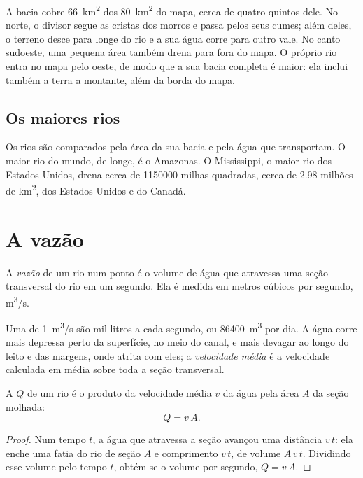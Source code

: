 A bacia cobre \qty{66}{km^2} dos \qty{80}{km^2} do mapa, cerca de quatro
quintos dele. No norte, o divisor segue as cristas dos morros e passa pelos
seus cumes; além deles, o terreno desce para longe do rio e a sua água corre
para outro vale. No canto sudoeste, uma pequena área também drena para fora
do mapa. O próprio rio entra no mapa pelo oeste, de modo que a sua bacia
completa é maior: ela inclui também a terra a montante, além da borda do
mapa.

\subsection*{Os maiores rios}

Os rios são comparados pela área da sua bacia e pela água que transportam.
O maior rio do mundo, de longe, é o Amazonas. O Mississippi, o maior rio dos
Estados Unidos, drena cerca de \num{1150000} milhas quadradas, cerca de 2.98
milhões de \unit{km^2}, dos Estados Unidos e do Canadá.

\section{A vazão}

\begin{definition}[Vazão]\label{def:g10:drainage-basins:discharge}
A \emph{vazão} de um rio num ponto é o volume de água que
atravessa uma seção transversal do rio em um segundo. Ela é medida em metros
cúbicos por segundo, \unit{m^3/s}.
\end{definition}

Uma  de \qty{1}{m^3/s} são mil litros a cada segundo, ou
\qty{86400}{m^3} por dia. A água corre mais depressa perto da superfície, no
meio do canal, e mais devagar ao longo do leito e das margens, onde atrita
com eles; a \emph{velocidade média} é a velocidade calculada em média sobre
toda a seção transversal.

\begin{proposition}\label{prop:g10:drainage-basins:discharge}
A  $Q$ de um rio é o produto da velocidade média $v$ da água pela área
$A$ da seção molhada:
\[
Q = v\,A.
\]
\end{proposition}

\begin{proof}
Num tempo $t$, a água que atravessa a seção avançou uma distância $v\,t$:
ela enche uma fatia do rio de seção $A$ e comprimento $v\,t$, de volume
$A\,v\,t$. Dividindo esse volume pelo tempo $t$, obtém-se o volume por
segundo, $Q = v\,A$.
\end{proof}

